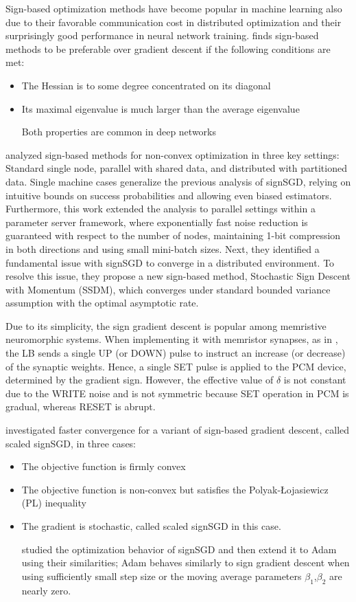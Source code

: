 \documentclass[11pt]{book}
\begin{document}
Sign-based optimization methods have become popular in machine learning
also due to their favorable communication cost in distributed optimization
and their surprisingly good performance in neural network training.
\cite{balles2020geometry} finds sign-based methods to be preferable
over gradient descent if the following conditions are met:
\begin{itemize}
\item The Hessian is to some degree concentrated on its diagonal
\item Its maximal eigenvalue is much larger than the average eigenvalue

Both properties are common in deep networks
\end{itemize}
\cite{safaryan2021stochastic} analyzed sign-based methods for non-convex
optimization in three key settings: Standard single node, parallel
with shared data, and distributed with partitioned data. Single machine
cases generalize the previous analysis of signSGD, relying on intuitive
bounds on success probabilities and allowing even biased estimators.
Furthermore, this work extended the analysis to parallel settings
within a parameter server framework, where exponentially fast noise
reduction is guaranteed with respect to the number of nodes, maintaining
1-bit compression in both directions and using small mini-batch sizes.
Next, they identified a fundamental issue with signSGD to converge
in a distributed environment. To resolve this issue, they propose
a new sign-based method, Stochastic Sign Descent with Momentum (SSDM),
which converges under standard bounded variance assumption with the
optimal asymptotic rate.

Due to its simplicity, the sign gradient descent is popular among
memristive neuromorphic systems. When implementing it with memristor
synapses, as in \cite{demirag2021online}, the LB sends a single UP
(or DOWN) pulse to instruct an increase (or decrease) of the synaptic
weights. Hence, a single SET pulse is applied to the PCM device, determined
by the gradient sign. However, the effective value of $\delta$ is
not constant due to the WRITE noise and is not symmetric because SET
operation in PCM is gradual, whereas RESET is abrupt.

\cite{li2021faster} investigated faster convergence for a variant
of sign-based gradient descent, called scaled signSGD, in three cases:
\begin{itemize}
\item The objective function is firmly convex
\item The objective function is non-convex but satisfies the Polyak-Łojasiewicz
(PL) inequality
\item The gradient is stochastic, called scaled signSGD in this case.

\cite{zou2021understanding} studied the optimization behavior of
signSGD and then extend it to Adam using their similarities; Adam
behaves similarly to sign gradient descent when using sufficiently
small step size or the moving average parameters $\beta_{1}$,$\beta_{2}$
are nearly zero.
\end{itemize}
\end{document}
